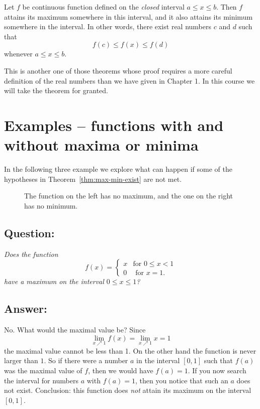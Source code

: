 \begin{theorem}\label{thm:max-min-exist}
  Let $f$ be continuous function defined on the \emph{closed} interval
  $a\leq x\leq b$.  Then $f$ attains its maximum somewhere in this
  interval, and it also attains its minimum somewhere in the interval.
  In other words, there exist real numbers $c$ and $d$ such that
  \[
  f(c)\leq f(x) \leq f(d)
  \]
  whenever $a\leq x\leq b$.
\end{theorem}\smallskip

This is another one of those theorems whose proof requires a more
careful definition of the real numbers than we have given in Chapter
1.  In this course we will take the theorem for granted.

\section{Examples -- functions with and without maxima or minima}
In the following three example we explore what can happen if some of the
hypotheses in Theorem~\ref{thm:max-min-exist} are not met.

\begin{figure}[h]\centering
  \begin{minipage} {110pt}
    
  \end{minipage}
  \hfill
  \begin{minipage}{240pt}
    
  \end{minipage}
  \caption{The function on the left has no maximum, and the one on the right has
    no minimum.}\label{fig:05nomaxnomin}
\end{figure}
\subsection{Question: }
\itshape Does the function
\[
f(x) =
\begin{cases}
  x & \text{for }0\leq x<1 \\ 0 &\text{ for }x=1.
\end{cases}
\]
have a maximum on the interval $0\leq x\leq 1$?\upshape

\subsection*{Answer: }
No.  What would the maximal value be?  Since
\[
\lim_{x\nearrow1}f(x) = \lim_{x\nearrow1}x = 1
\]
the maximal value cannot be less than 1.  On the other hand the function is
never larger than $1$.  So if there were a number $a$ in the interval $[0,1]$
such that $f(a)$ was the maximal value of $f$, then we would have $f(a) = 1$.
If you now search the interval for numbers $a$ with $f(a) = 1$, then you notice
that such an $a$ does not exist.  Conclusion: this function does \emph{not}
attain its maximum on the interval $[0,1]$.


